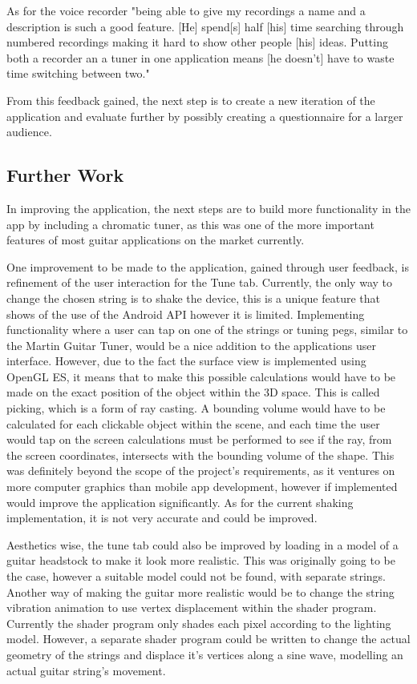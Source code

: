 \documentclass[conference]{acmsiggraph}
\begin{document}
As for the voice recorder "being able to give my recordings a name and a description is such a good feature. [He] spend[s] half [his] time searching through numbered recordings making it hard to show other people [his] ideas. Putting both a recorder an a tuner in one application means [he doesn't] have to waste time switching between two." 

From this feedback gained, the next step is to create a new iteration of the application and evaluate further by possibly creating a questionnaire for a larger audience.

\subsection{Further Work}

In improving the application, the next steps are to build more functionality in the app by including a chromatic tuner, as this was one of the more important features of most guitar applications on the market currently.

One improvement to be made to the application, gained through user feedback, is refinement of the user interaction for the Tune tab. Currently, the only way to change the chosen string is to shake the device, this is a unique feature that shows of the use of the Android API however it is limited. Implementing functionality where a user can tap on one of the strings or tuning pegs, similar to the Martin Guitar Tuner, would be a nice addition to the applications user interface. However, due to the fact the surface view is implemented using OpenGL ES, it means that to make this possible calculations would have to be made on the exact position of the object within the 3D space. This is called picking, which is a form of ray casting. \cite{ray} A bounding volume would have to be calculated for each clickable object within the scene, and each time the user would tap on the screen calculations must be performed to see if the ray, from the screen coordinates, intersects with the bounding volume of the shape. This was definitely beyond the scope of the project's requirements, as it ventures on more computer graphics than mobile app development, however if implemented would improve the application significantly. As for the current shaking implementation, it is not very accurate and could be improved.

Aesthetics wise, the tune tab could also be improved by loading in a model of a guitar headstock to make it look more realistic. This was originally going to be the case, however a suitable model could not be found, with separate strings. Another way of making the guitar more realistic would be to change the string vibration animation to use vertex displacement within the shader program. Currently the shader program only shades each pixel according to the lighting model. However, a separate shader program could be written to change the actual geometry of the strings and displace it's vertices along a sine wave, modelling an actual guitar string's movement.
\end{document}
